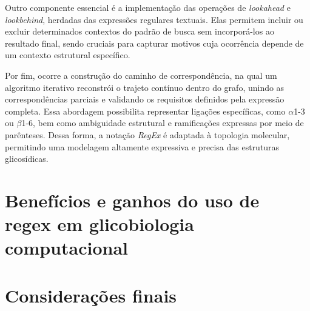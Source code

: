 Outro componente essencial é a implementação das operações de \textit{lookahead} e \textit{lookbehind}, herdadas das expressões regulares textuais. Elas permitem incluir ou excluir determinados contextos do padrão de busca sem incorporá-los ao resultado final, sendo cruciais para capturar motivos cuja ocorrência depende de um contexto estrutural específico.

Por fim, ocorre a construção do caminho de correspondência, na qual um algoritmo iterativo reconstrói o trajeto contínuo dentro do grafo, unindo as correspondências parciais e validando os requisitos definidos pela expressão completa. Essa abordagem possibilita representar ligações específicas, como $\alpha$1-3 ou $\beta$1-6, bem como ambiguidade estrutural e ramificações expressas por meio de parênteses. Dessa forma, a notação \textit{RegEx} é adaptada à topologia molecular, permitindo uma modelagem altamente expressiva e precisa das estruturas glicosídicas.

\section{Benefícios e ganhos do uso de regex em glicobiologia computacional}


\section{Considerações finais}

